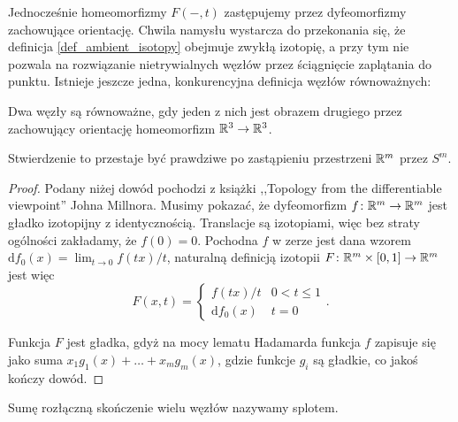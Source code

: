Jednocześnie homeomorfizmy $F(-,t)$ zastępujemy przez dyfeomorfizmy zachowujące orientację.
Chwila namysłu wystarcza do przekonania się, że definicja \ref{def_ambient_isotopy} obejmuje zwykłą izotopię,
a przy tym nie pozwala na rozwiązanie nietrywialnych węzłów przez ściągnięcie zaplątania do punktu.
Istnieje jeszcze jedna, konkurencyjna definicja węzłów równoważnych:

\begin{definition}
	Dwa węzły są równoważne, gdy jeden z nich jest obrazem drugiego przez zachowujący orientację homeomorfizm $\mathbb R^3 \to \mathbb R^3$.
\end{definition}

Stwierdzenie to przestaje być prawdziwe po zastąpieniu przestrzeni $\mathbb R^m$ przez $S^m$.

\begin{proof}
	Podany niżej dowód pochodzi z książki ,,Topology from the differentiable viewpoint'' Johna Millnora.
	Musimy pokazać, że dyfeomorfizm $f \colon \mathbb R^m \to \mathbb R^m$ jest gładko izotopijny z identycznością.
	Translacje są izotopiami, więc bez straty ogólności zakładamy, że $f(0) = 0$.
	Pochodna $f$ w zerze jest dana wzorem $\mathrm{d}f_0(x) = \lim_{t \to 0} f(tx) /t$,
	naturalną definicją	izotopii $F \colon \mathbb R^m \times [0, 1] \to \mathbb R^m$ jest więc
	\[
		F(x, t) = \begin{cases}
			f(tx) / t & 0 < t \le 1 \\
			\mathrm{d}f_0(x) & t = 0
		\end{cases} .
	\]

	Funkcja $F$ jest gładka,
	gdyż na mocy lematu Hadamarda funkcja $f$ zapisuje się jako suma $x_1 g_1(x) + \ldots + x_mg_m(x)$,
	gdzie funkcje $g_i$ są gładkie, co jakoś kończy dowód.
\end{proof}

\begin{definition}[splot] \label{def_link}
	Sumę rozłączną skończenie wielu węzłów nazywamy splotem.
\end{definition}

